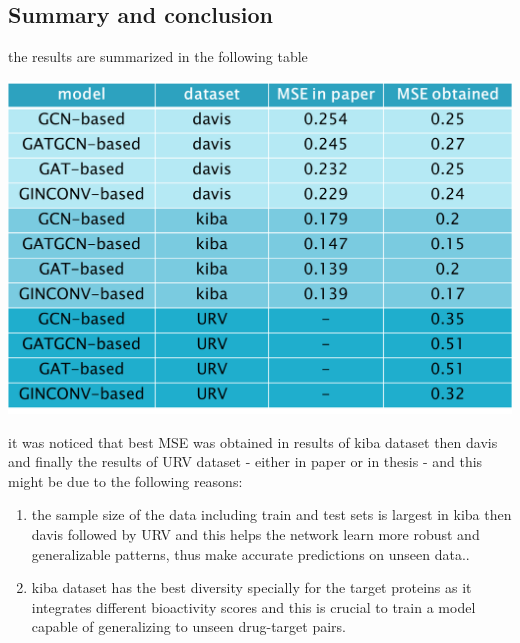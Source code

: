 \documentclass[11pt, a4paper]{article}
\begin{document}
    \subsection{Summary and conclusion}
        the results are summarized in the following table
        \begin{center}
            \includegraphics[width=1.0\textwidth]{summary.png}
        \end{center}
        it was noticed that best MSE was obtained in results of kiba dataset then davis and finally the results of URV dataset - either in paper or in thesis - and this might be due to the following reasons:
        \begin{enumerate}
            \item the sample size of the data including train and test sets is largest in kiba then davis followed by URV and this helps the network learn more robust and generalizable patterns, thus make accurate predictions on unseen data..
            \item kiba dataset has the best diversity specially for the target proteins as it integrates different bioactivity scores and this is crucial to train a model capable of generalizing to unseen drug-target pairs.  
        \end{enumerate}
\end{document}
